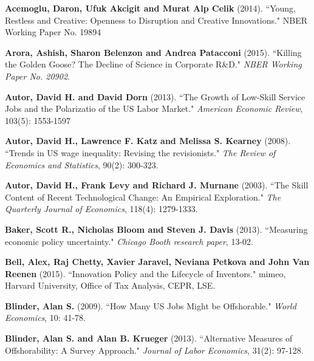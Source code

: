 \documentclass[11pt,a4paper]{article}
\begin{document}
\clearpage
\vspace*{0.5cm}
\begin{thebibliography}{9}
	
	 \textbf{Acemoglu, Daron, Ufuk Akcigit and Murat Alp Celik} (2014). ``Young, Restless and Creative: Openness to Disruption and Creative Innovations." NBER Working Paper No. 19894

	 \textbf{Arora, Ashish, Sharon Belenzon and Andrea Patacconi} (2015). ``Killing the Golden Goose? The Decline of Science in Corporate R\&D." \textit{NBER Working Paper No. 20902}.
	
	 \textbf{Autor, David H. and David Dorn} (2013). ``The Growth of Low-Skill Service Jobs and the Polarizatio of the US Labor Market." \textit{American Economic Review}, 103(5): 1553-1597
	
	 \textbf{Autor, David H., Lawrence F. Katz and Melissa S. Kearney} (2008). ``Trends in US wage inequality: Revising the revisionists." \textit{The Review of Economics and Statistics}, 90(2): 300-323.
	
	 \textbf{Autor, David H., Frank Levy and Richard J. Murnane} (2003). ``The Skill Content of Recent Technological Change: An Empirical Exploration." \textit{The Quarterly Journal of Economics}, 118(4): 1279-1333.
	
	 \textbf{Baker, Scott R., Nicholas Bloom and Steven J. Davis} (2013). ``Measuring economic policy uncertainty." \textit{Chicago Booth research paper}, 13-02.
	
	 \textbf{Bell, Alex, Raj Chetty, Xavier Jaravel, Neviana Petkova and John Van Reenen} (2015). ``Innovation Policy and the Lifecycle of Inventors." mimeo, Harvard University, Office of Tax Analysis, CEPR, LSE.
	
	
	 \textbf{Blinder, Alan S.} (2009). ``How Many US Jobs Might be Offshorable." \textit{World Economics}, 10: 41-78.
	
	 \textbf{Blinder, Alan S. and Alan B. Krueger} (2013). ``Alternative Measures of Offshorability: A Survey Approach." \textit{Journal of Labor Economics}, 31(2): 97-128.
	

\end{thebibliography}
\end{document}
